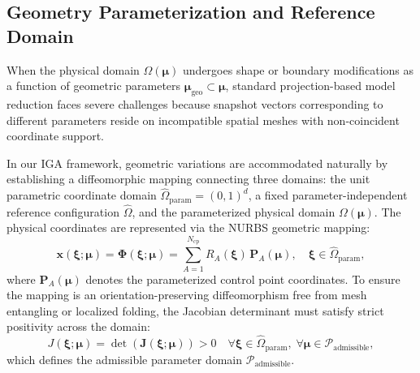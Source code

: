 \subsection{Geometry Parameterization and Reference Domain}
\label{subsec:ref_mapping_concept}
When the physical domain $\Omega(\bm{\mu})$ undergoes shape or boundary modifications as a function of geometric parameters $\bm{\mu}_{\text{geo}} \subset \bm{\mu}$, standard projection-based model reduction faces severe challenges because snapshot vectors corresponding to different parameters reside on incompatible spatial meshes with non-coincident coordinate support.

In our IGA framework, geometric variations are accommodated naturally by establishing a diffeomorphic mapping connecting three domains: the unit parametric coordinate domain $\hat{\Omega}_{\text{param}} = (0, 1)^d$, a fixed parameter-independent reference configuration $\hat{\Omega}$, and the parameterized physical domain $\Omega(\bm{\mu})$. The physical coordinates are represented via the NURBS geometric mapping:
\begin{equation}
    \bm{x}(\bm{\xi}; \bm{\mu}) = \bm{\Phi}(\bm{\xi}; \bm{\mu}) = \sum_{A=1}^{N_{\text{cp}}} R_A(\bm{\xi}) \, \bm{P}_A(\bm{\mu}), \quad \bm{\xi} \in \hat{\Omega}_{\text{param}},
    \label{eq:geo_mapping}
\end{equation}
where $\bm{P}_A(\bm{\mu})$ denotes the parameterized control point coordinates. To ensure the mapping is an orientation-preserving diffeomorphism free from mesh entangling or localized folding, the Jacobian determinant must satisfy strict positivity across the domain:
\begin{equation}
    J(\bm{\xi}; \bm{\mu}) = \det(\bm{J}(\bm{\xi}; \bm{\mu})) > 0 \quad \forall \bm{\xi} \in \hat{\Omega}_{\text{param}}, \; \forall \bm{\mu} \in \mathcal{P}_{\text{admissible}},
    \label{eq:positivity_jacobian}
\end{equation}
which defines the admissible parameter domain $\mathcal{P}_{\text{admissible}}$.

